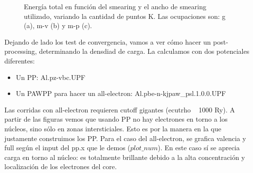 \begin{figure}[H]
      \caption{Energía total en función del smearing y el ancho de smearing utilizado, variando la cantidad de puntos K. Las ocupaciones son: g (a), m-v (b) y m-p (c).}
  \end{figure}

  Dejando de lado los test de convergencia, vamos a ver cómo hacer un post-processing, determinando la densdiad de carga. La calculamos con dos potenciales diferentes:
    \begin{itemize}
      \item Un PP: Al.pz-vbc.UPF
      \item Un PAWPP para hacer un all-electron: Al.pbe-n-kjpaw\_psl.1.0.0.UPF
    \end{itemize}

  Las corridas con all-electron requieren cutoff gigantes (ecutrho ~ 1000 Ry). A partir de las figuras vemos que usando PP no hay electrones en torno a los núcleos, sino sólo en zonas intersticiales. Esto es por la manera en la que justamente construimos los PP. Para el caso del all-electron, se grafica valencia y full según el input del pp.x que le demos ($plot\_num$). En este caso sí se aprecia carga en torno al núcleo: es totalmente brillante debido a la alta concentración y localización de los electrones del core.

